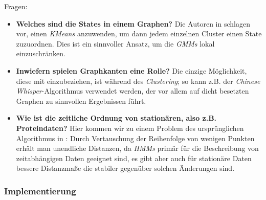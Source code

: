 \documentclass{DEarticle}
\begin{document}
Fragen:
\begin{itemize}
\item \textbf{Welches sind die States in einem Graphen?} Die Autoren in \cite{comp} schlagen vor, einen \emph{KMeans}
anzuwenden, um dann jedem einzelnen Cluster einen State zuzuordnen. Dies ist ein sinnvoller Ansatz, um die \emph{GMMs}
lokal einzuschränken.
\item \textbf{Inwiefern spielen Graphkanten eine Rolle?} Die einzige Möglichkeit, diese mit einzubeziehen, ist während
des \emph{Clustering}; so kann z.B. der \cite{chinese} \emph{Chinese Whisper}-Algorithmus verwendet werden, der
vor allem auf dicht besetzten Graphen zu sinnvollen Ergebnissen führt.
\item \textbf{Wie ist die zeitliche Ordnung von stationären, also z.B. Proteindaten?} Hier kommen wir zu einem Problem des ursprünglichen
Algorithmus in \cite{comp}: Durch Vertauschung der Reihenfolge von wenigen Punkten erhält man unendliche Distanzen, da
\emph{HMMs} primär für die Beschreibung von zeitabhängigen Daten geeignet sind, es gibt aber auch für stationäre Daten
bessere Distanzmaße die stabiler gegenüber solchen Änderungen sind.
\end{itemize}

\subsubsection{Implementierung}






\label{newmethod}
\end{document}
